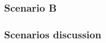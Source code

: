 \documentclass{article}
\begin{document}
\subsubsection{Scenario B}

\subsubsection{Scenarios discussion}







\end{document}
